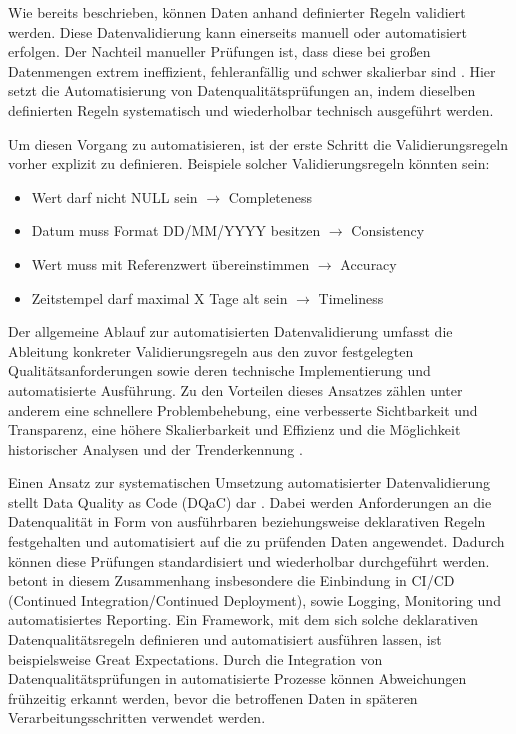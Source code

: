 \documentclass[../main.tex]{subfiles}
\begin{document}
Wie bereits beschrieben, können Daten anhand definierter Regeln validiert werden. Diese Datenvalidierung kann einerseits manuell oder automatisiert erfolgen. Der
Nachteil manueller Prüfungen ist, dass diese bei großen Datenmengen extrem ineffizient, fehleranfällig und schwer skalierbar sind \parencite{pasalaDataQualityCode2024}. Hier setzt die Automatisierung von Datenqualitätsprüfungen an, indem dieselben definierten Regeln systematisch und wiederholbar technisch ausgeführt werden.

Um diesen Vorgang zu automatisieren, ist der erste Schritt die Validierungsregeln vorher explizit zu definieren. 
Beispiele solcher Validierungsregeln könnten sein:
\begin{itemize}
    \item Wert darf nicht NULL sein $\longrightarrow$ Completeness
    \item Datum muss Format DD/MM/YYYY besitzen $\longrightarrow$ Consistency
    \item Wert muss mit Referenzwert übereinstimmen $\longrightarrow$ Accuracy
    \item Zeitstempel darf maximal X Tage alt sein $\longrightarrow$ Timeliness
\end{itemize}

Der allgemeine Ablauf zur automatisierten Datenvalidierung umfasst die Ableitung konkreter Validierungsregeln aus den zuvor festgelegten Qualitätsanforderungen sowie deren technische Implementierung und automatisierte Ausführung. Zu den Vorteilen dieses Ansatzes zählen unter anderem eine schnellere Problembehebung, eine verbesserte Sichtbarkeit und Transparenz, eine höhere Skalierbarkeit und Effizienz und die Möglichkeit historischer Analysen und der Trenderkennung \parencite{pasalaDataQualityCode2024}. 

Einen Ansatz zur systematischen Umsetzung automatisierter Datenvalidierung stellt Data Quality as Code (DQaC) dar \parencite{pasalaDataQualityCode2024}. Dabei werden Anforderungen an die Datenqualität in Form von ausführbaren beziehungsweise deklarativen Regeln festgehalten und automatisiert auf die zu prüfenden Daten angewendet. Dadurch können diese Prüfungen standardisiert und wiederholbar durchgeführt werden. \textcite{pasalaDataQualityCode2024} betont in diesem Zusammenhang insbesondere die Einbindung in CI/CD (Continued Integration/Continued Deployment), sowie Logging, Monitoring und automatisiertes Reporting. Ein Framework, mit dem sich solche deklarativen Datenqualitätsregeln definieren und automatisiert ausführen lassen, ist beispielsweise Great Expectations. Durch die Integration von Datenqualitätsprüfungen in automatisierte Prozesse können Abweichungen frühzeitig erkannt werden, bevor die betroffenen Daten in späteren Verarbeitungsschritten verwendet werden.
\end{document}
